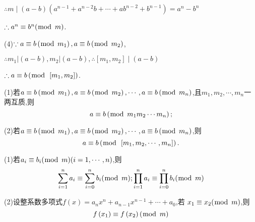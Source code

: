 $\therefore m \mid(a-b)\left(a^{n-1}+a^{n-2} b+\cdots+a b^{n-2}+b^{n-1}\right)=a^{n}-b^{n}$

$\therefore a^{n} \equiv b^{n}(\bmod \hspace{1ex}m)$.

(4)$\because a \equiv b\left(\bmod \hspace{1ex}m_{1}\right), a \equiv b\left(\bmod \hspace{1ex}m_{2}\right)$,

$\therefore m_{1}\left|(a-b), m_{2}\right|(a-b), \therefore\left[m_{1}, m_{2}\right] \mid(a-b)$

$\therefore a \equiv b\left(\bmod \hspace{1ex}\left[m_{1}, m_{2}\right]\right)$.

\corollary (1)若$a \equiv b\left(\bmod\hspace{1ex} m_{1}\right), a \equiv b\left(\bmod\hspace{1ex} m_{2}\right), \cdots, a \equiv b\left(\bmod\hspace{1ex} m_{n}\right)$,且$m_{1}, m_{2},\cdots, m_{n}$一两互质,则
\begin{equation*}
	a \equiv b\left(\bmod\hspace{1ex} m_{1} m_{2} \cdots m_{n}\right) ;
\end{equation*}

(2)若$a \equiv b\left(\bmod\hspace{1ex} m_{1}\right), a \equiv b\left(\bmod\hspace{1ex} m_{2}\right), \cdots, a \equiv b\left(\bmod\hspace{1ex} m_{n}\right)$,则
\begin{equation*}
	a \equiv b\left(\bmod\hspace{1ex} \left[m_{1}, m_{2}, \cdots, m_{n}\right]\right) .
\end{equation*}

\corollary (1)若$a_{i} \equiv b_{i}(\bmod \hspace{1ex}m)(i=1, \cdots, n)$,则
\begin{equation*}
	\sum_{i=1}^{n} a_{i} \equiv \sum_{i=0}^{n} b_{i}(\bmod \hspace{1ex}m) ; \prod_{i=1}^{n} a_{i} \equiv \prod_{i=0}^{n} b_{i}(\bmod \hspace{1ex}m)
\end{equation*}

(2)设整系数多项式$f(x)=a_{n} x^{n}+a_{n-1} x^{n-1}+\cdots+a_{0}$,若 $x_{1} \equiv x_{2}(\bmod\hspace{1ex} m)$,则
\begin{equation*}
	f\left(x_{1}\right) \equiv f\left(x_{2}\right)(\bmod \hspace{1ex}m)
\end{equation*}

